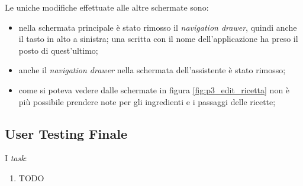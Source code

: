 Le uniche modifiche effettuate alle altre schermate sono:
\begin{itemize}
  \item nella schermata principale è stato rimosso il \textit{navigation drawer}, quindi anche il tasto in alto a sinistra; una scritta con il nome dell'applicazione ha preso il posto di quest'ultimo;

  \item anche il \textit{navigation drawer} nella schermata dell'assistente è stato rimosso;

  \item come si poteva vedere dalle schermate in figura \ref{fig:p3_edit_ricetta} non è più possibile prendere note per gli ingredienti e i passaggi delle ricette;
\end{itemize}


\clearpage
\subsection{User Testing Finale}
I \textit{task}:
\begin{enumerate}
  \item TODO
\end{enumerate}

